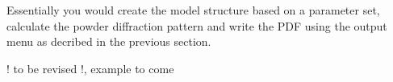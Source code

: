 Essentially you would create the model structure based on a parameter set, 
calculate the powder diffraction pattern and write the PDF using the 
output menu as decribed in the previous section. 
\par
! to be revised !, example to come
\par
%

